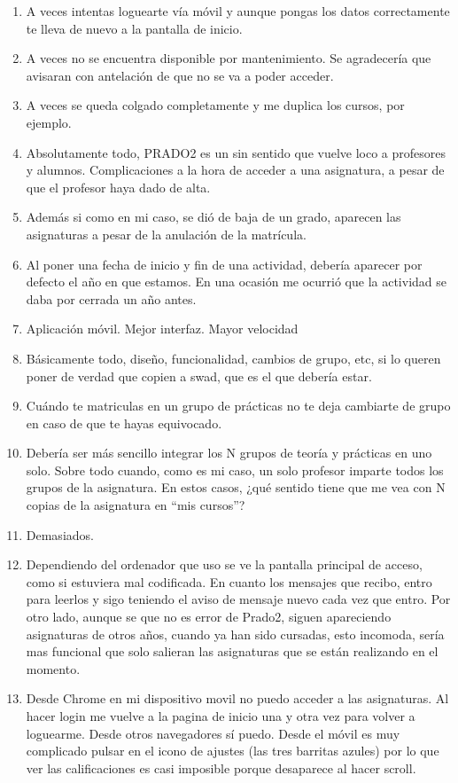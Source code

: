 \begin{enumerate}
\item A veces intentas loguearte vía móvil y aunque pongas los datos correctamente te lleva de nuevo a la pantalla de inicio.
\item A veces no se encuentra disponible por mantenimiento. Se agradecería que avisaran con antelación de que no se va a poder acceder.
\item A veces se queda colgado completamente y me duplica los cursos, por ejemplo.
\item Absolutamente todo, PRADO2 es un sin sentido que vuelve loco a profesores y alumnos. Complicaciones a la hora de acceder a una asignatura, a pesar de que el profesor haya dado de alta.
\item Además si como en mi caso, se dió de baja de un grado, aparecen las asignaturas a pesar de la anulación de la matrícula.
\item Al poner una fecha de inicio y fin de una actividad, debería aparecer por defecto el año en que estamos. En una ocasión me ocurrió que la actividad se daba por cerrada un año antes.
\item Aplicación móvil. Mejor interfaz. Mayor velocidad
\item Básicamente todo, diseño, funcionalidad, cambios de grupo, etc, si lo queren poner de verdad que copien a swad, que es el que debería estar.
\item Cuándo te matriculas en un grupo de prácticas no te deja cambiarte de grupo en caso de que te hayas equivocado.
\item Debería ser más sencillo integrar los N grupos de teoría y prácticas en uno solo. Sobre todo cuando, como es mi caso, un solo profesor imparte todos los grupos de la asignatura. En estos casos, ¿qué sentido tiene que me vea con N copias de la asignatura en ``mis cursos''?
\item Demasiados.
\item Dependiendo del ordenador que uso se ve la pantalla principal de acceso, como si estuviera mal codificada. En cuanto los mensajes que recibo, entro para leerlos y sigo teniendo el aviso de mensaje nuevo cada vez que entro. Por otro lado, aunque se que no es error de Prado2, siguen apareciendo asignaturas de otros años, cuando ya han sido cursadas, esto incomoda, sería mas funcional que solo salieran las asignaturas que se están realizando en el momento.
\item Desde Chrome en mi dispositivo movil no puedo acceder a las asignaturas. Al hacer login me vuelve a la pagina de inicio una y otra vez para volver a loguearme. Desde otros navegadores sí puedo. Desde el móvil es muy complicado pulsar en el icono de ajustes (las tres barritas azules) por lo que ver las calificaciones es casi imposible porque desaparece al hacer scroll.

\end{enumerate}
